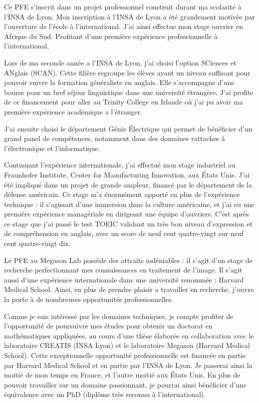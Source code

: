 Ce PFE s'inscrit dans un projet professionnel construit durant ma scolarité à l'INSA de Lyon.
Mon inscription à l'INSA de Lyon a été grandement motivée par l'ouverture de l'école à l'international. J'ai ainsi effectue mon stage ouvrier en Afrique du Sud. Profitant d'une première expérience professionnelle à l'international.

Lors de ma seconde année a l'INSA de Lyon, j'ai choisi l'option SCiences et ANglais (SCAN).
Cette filière regroupe les élèves ayant un niveau suffisant pour pouvoir suivre la formation généraliste en anglais.
Elle s'accompagne d'une bourse pour un bref séjour linguistique dans une université étrangère.
J'ai profite de ce financement pour aller au Trinity College en Irlande où
j'ai pu avoir ma première expérience académique a l'étranger.

J'ai ensuite choisi le département
Génie Électrique qui permet de bénéficier d'un grand panel de compétences,
notamment dans des domaines rattaches à l'électronique et l'informatique.


Continuant l'expérience internationale, j'ai effectué mon stage industriel au
Fraunhofer Institute, Center for Manufacturing Innovation, aux États Unis.
J'ai été impliqué dans un projet de grande ampleur, financé par le département de la défense américain.
Ce stage m'a énormément apporté en plus de l'expérience technique : il s'agissait d'une immersion dans la culture américaine, et j'ai eu une première expérience managériale en dirigeant une équipe d'ouvriers.
C'est après ce stage que j'ai passé le test TOEIC validant un très bon niveau d'expression et de compréhension en anglais,
avec un score de neuf cent quatre-vingt sur neuf cent quatre-vingt dix.


Le PFE au Megason Lab possède des attraits indéniables :
il s'agit d'un stage de recherche perfectionnant mes connaissances en traitement de l'image.
Il s'agit aussi d'une expérience internationale dans une université renommée : Harvard Medical School.
Ainsi, en plus de prendre plaisir a travailler en recherche, j'ouvre la porte à de nombreuses opportunités professionnelles.

Comme je suis intéressé par les domaines techniques,
je compte profiter de l'opportunité de poursuivre mes études pour obtenir un doctorat en mathématiques appliquées,
au cours d'une thèse élaborée en collaboration avec le laboratoire CREATIS (INSA Lyon)
et le laboratoire Megason (Harvard Medical School).
Cette exceptionnelle opportunité professionnelle est financée en partie par Harvard Medical School
et en partie par l'INSA de Lyon. Je passerai ainsi la moitié de mon temps en France, et l'autre moitié aux États Unis.
En plus de pouvoir travailler sur un domaine passionnant,
je pourrai ainsi bénéficier d'une équivalence avec un PhD (diplôme très reconnu à l'international). 

